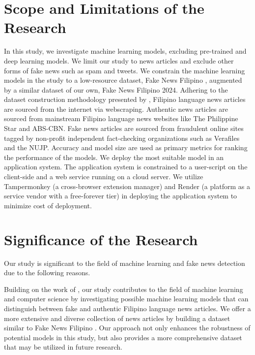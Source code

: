\section{Scope and Limitations of the Research}
\label{sec:scopelimitations}

In this study, we investigate machine learning models, excluding pre-trained and deep learning models. We limit our study to news articles and exclude other forms of fake news such as spam and tweets. We constrain the machine learning models in the study to a low-resource dataset, Fake News Filipino \cite{fake-news-filipino}, augmented by a similar dataset of our own, Fake News Filipino 2024. Adhering to the dataset construction methodology presented by , Filipino language news articles are sourced from the internet via webscraping. Authentic news articles are sourced from mainstream Filipino language news websites like The Philippine Star and ABS-CBN. Fake news articles are sourced from fraudulent online sites tagged by non-profit independent fact-checking organizations such as Verafiles and the NUJP. Accuracy and model size are used as primary metrics for ranking the performance of the models. We deploy the most suitable model in an application system. The application system is constrained to a user-script on the client-side and a web service running on a cloud server. We utilize Tampermonkey (a cross-browser extension manager) and Render (a platform as a service vendor with a free-forever tier) in deploying the application system to minimize cost of deployment.

\section{Significance of the Research}
\label{sec:significance}

Our study is significant to the field of machine learning and fake news detection due to the following reasons.

Building on the work of , our study contributes to the field of machine learning and computer science by investigating possible machine learning models that can distinguish between fake and authentic Filipino language news articles. We offer a more extensive and diverse collection of news articles by building a dataset similar to Fake News Filipino \cite{fake-news-filipino}. Our approach not only enhances the robustness of potential models in this study, but also provides a more comprehensive dataset that may be utilized in future research.

